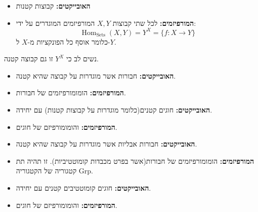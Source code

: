 \documentclass{tstextbook}
\begin{document}
\begin{definition}
  \begin{itemize}
    \item \textbf{האובייקטים:} קבוצות קטנות
    \item \textbf{המורפיזמים:} לכל שתי קבוצות \(X,Y\) המורפיזמים המוגדרים על ידי:
$$\operatorname{Hom}_{\operatorname{Sets}}(X,Y)=Y^{X}=\{f:X\to Y\}$$
כלומר אוסף כל הפונקציות מ-\(X\) ל-\(Y\).
  \end{itemize}
\end{definition}
\begin{remark}
נשים לב כי \(Y^{X}\) זו גם קבוצה קטנה.

\end{remark}
\begin{definition}
  \begin{itemize}
    \item \textbf{האובייקטים:} חבורות אשר מוגדרות על קבוצה שהיא קטנה.
    \item \textbf{המורפיזמים:} הומומורפיזמים של חבורות.
  \end{itemize}
\end{definition}
\begin{definition}
  \begin{itemize}
    \item \textbf{האובייקטים:} חוגים קטנים(כלומר מוגדרות על קבוצות קטנות) עם יחידה.
    \item \textbf{המורפיזמים:} והומומורפיזם של חוגים.
  \end{itemize}
\end{definition}
\begin{definition}
  \begin{itemize}
    \item \textbf{האובייקטים:} חבורות אבליות אשר מוגדרות על קבוצה שהיא קטנה.
    \item \textbf{המורפיזמים:} הומומורפיזמים של חבורות(אשר בפרט מכבדות קומוטטיביות).
זו תהיה תת קטגוריה של הקטגוריה \(\mathrm{Grp}\).
  \end{itemize}
\end{definition}
\begin{definition}
  \begin{itemize}
    \item \textbf{האובייקטים:} חוגים קומוטטיבים קטנים עם יחידה.
    \item \textbf{המורפיזמים:} והומומורפיזם של חוגים.
  \end{itemize}
\end{definition}
\end{document}
